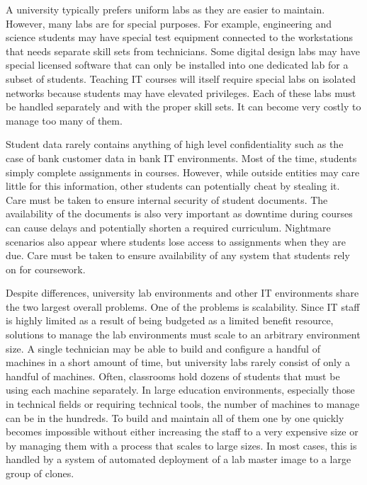 A university typically prefers uniform labs as they are easier to maintain.  However, many labs are for special purposes.  For example, engineering and science students may have special test equipment connected to the workstations that needs separate skill sets from technicians.  Some digital design labs may have special licensed software that can only be installed into one dedicated lab for a subset of students.  Teaching IT courses will itself require special labs on isolated networks because students may have elevated privileges.  Each of these labs must be handled separately and with the proper skill sets.  It can become very costly to manage too many of them. 

Student data rarely contains anything of high level confidentiality such as the case of bank customer data in bank IT environments.  Most of the time, students simply complete assignments in courses.  However, while outside entities may care little for this information, other students can potentially cheat by stealing it.  Care must be taken to ensure internal security of student documents.  The availability of the documents is also very important as downtime during courses can cause delays and potentially shorten a required curriculum.  Nightmare scenarios also appear where students lose access to assignments when they are due.  Care must be taken to ensure availability of any system that students rely on for coursework. 

Despite differences, university lab environments and other IT environments share the two largest overall problems.  One of the problems is scalability.  Since IT staff is highly limited as a result of being budgeted as a limited benefit resource, solutions to manage the lab environments must scale to an arbitrary environment size.  A single technician may be able to build and configure a handful of machines in a short amount of time, but university labs rarely consist of only a handful of machines.  Often, classrooms hold dozens of students that must be using each machine separately.  In large education environments, especially those in technical fields or requiring technical tools, the number of machines to manage can be in the hundreds.  To build and maintain all of them one by one quickly becomes impossible without either increasing the staff to a very expensive size or by managing them with a process that scales to large sizes.  In most cases, this is handled by a system of automated deployment of a lab master image to a large group of clones. 

